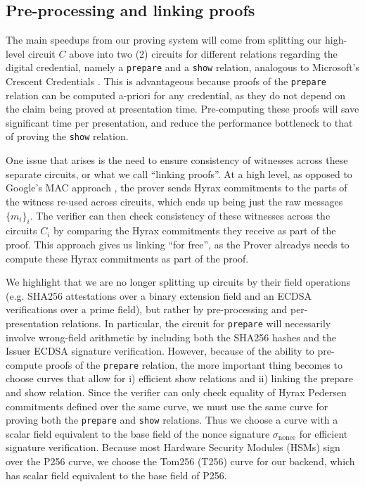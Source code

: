 \subsection{Pre-processing and linking proofs}

The main speedups from our proving system will come from splitting our high-level circuit $C$ above into two (2) circuits for different relations regarding the digital credential, 
namely a \texttt{prepare} and a \texttt{show} relation, analogous to Microsoft's Crescent Credentials \cite{cryptoeprint:2024/2013}. 
This is advantageous because proofs of the \texttt{prepare} relation can be computed a-priori for any credential, as they do not depend on the claim being proved at presentation time. 
Pre-computing these proofs will save significant time per presentation, and reduce the performance bottleneck to that of proving the \texttt{show} relation.

One issue that arises is the need to ensure consistency of witnesses across these separate circuits, or what we call ``linking proofs''. 
At a high level, as opposed to Google's MAC approach \cite{cryptoeprint:2024/2010}, the prover sends Hyrax commitments to the parts of the witness re-used across circuits, 
which ends up being just the raw messages $\{m_i\}_i$. 
The verifier can then check consistency of these witnesses across the circuits $C_i$ by comparing the Hyrax commitments they receive as part of the proof. 
This approach gives us linking ``for free'', as the Prover alreadys needs to compute these Hyrax commitments as part of the proof.

We highlight that we are no longer splitting up circuits by their field operations 
(e.g. SHA256 attestations over a binary extension field and an ECDSA verifications over a prime field), but rather by pre-processing and per-presentation relations. 
In particular, the circuit for \texttt{prepare} will necessarily involve wrong-field arithmetic by including both the SHA256 hashes and the Issuer ECDSA signature verification. 
However, because of the ability to pre-compute proofs of the \texttt{prepare} relation, the more important thing becomes to choose curves that allow for i) efficient show relations and ii) linking the prepare and show relation. 
Since the verifier can only check equality of Hyrax Pedersen commitments defined over the same curve, we must use the same curve for proving both the \texttt{prepare} and \texttt{show} relations.
Thus we choose a curve with a scalar field equivalent to the base field of the nonce signature $\sigma_{\text{nonce}}$ for efficient signature verification. 
Because most Hardware Security Modules (HSMs) sign over the P256 curve, we choose the Tom256 (T256) curve for our backend, which has scalar field equivalent to the base field of P256. 

